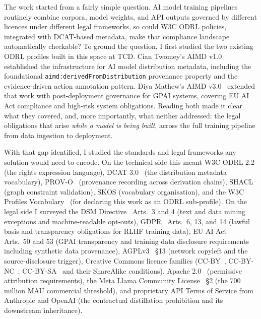 \documentclass[12pt,a4paper]{article}
\begin{document}
The work started from a fairly simple question. AI model training pipelines routinely combine corpora, model weights, and API outputs governed by different licences under different legal frameworks, so could W3C ODRL policies, integrated with DCAT-based metadata, make that compliance landscape automatically checkable? To ground the question, I first studied the two existing ODRL profiles built in this space at TCD. Cian Twomey's AIMD v1.0~\cite{twomey2024} established the infrastructure for AI model distribution metadata, including the foundational \texttt{aimd:derivedFromDistribution} provenance property and the evidence-driven action annotation pattern. Diya Mathew's AIMD v3.0~\cite{mathew2026} extended that work with post-deployment governance for GPAI systems, covering EU AI Act compliance and high-risk system obligations. Reading both made it clear what they covered, and, more importantly, what neither addressed: the legal obligations that arise \emph{while a model is being built}, across the full training pipeline from data ingestion to deployment.

With that gap identified, I studied the standards and legal frameworks any solution would need to encode. On the technical side this meant W3C ODRL 2.2~\cite{odrl22} (the rights expression language), DCAT 3.0~\cite{dcat3} (the distribution metadata vocabulary), PROV-O~\cite{provo} (provenance recording across derivation chains), SHACL~\cite{shacl} (graph constraint validation), SKOS (vocabulary organisation), and the W3C Profiles Vocabulary~\cite{profilesvocab} (for declaring this work as an ODRL sub-profile). On the legal side I surveyed the DSM Directive~\cite{dsm2019} Arts.\ 3 and 4 (text and data mining exceptions and machine-readable opt-outs), GDPR~\cite{gdpr2016} Arts.\ 6, 13, and 14 (lawful basis and transparency obligations for RLHF training data), EU AI Act~\cite{euaiact2024} Arts.\ 50 and 53 (GPAI transparency and training data disclosure requirements including synthetic data provenance), AGPLv3~\cite{agplv3} \S 13 (network copyleft and the source-disclosure trigger), Creative Commons licence families (CC-BY~\cite{ccby40}, CC-BY-NC~\cite{ccbync40}, CC-BY-SA~\cite{ccbysa40} and their ShareAlike conditions), Apache 2.0~\cite{apache20} (permissive attribution requirements), the Meta Llama Community License~\cite{llamalicence} \S 2 (the 700 million MAU commercial threshold), and proprietary API Terms of Service from Anthropic and OpenAI (the contractual distillation prohibition and its downstream inheritance).
\end{document}
